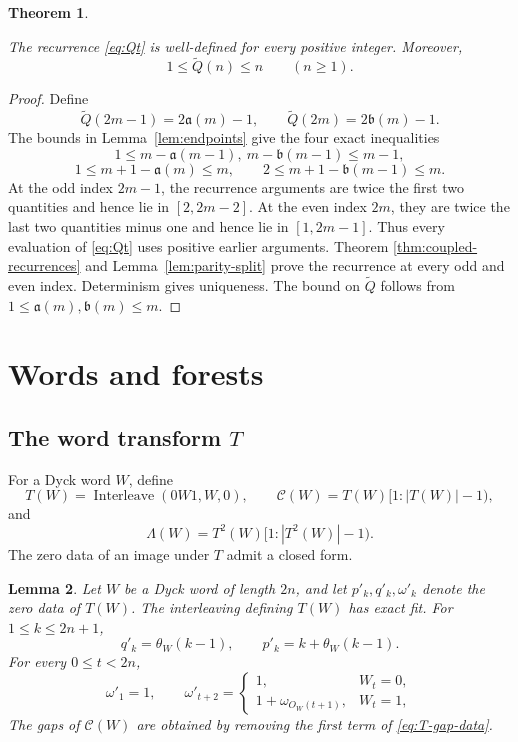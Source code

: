 \documentclass[11pt]{article}
\newtheorem{theorem}{Theorem}[section]
\newtheorem{lemma}[theorem]{Lemma}
\theoremstyle{definition}
\theoremstyle{remark}
\DeclareMathOperator{\Interleave}{Interleave}
\newcommand{\Qt}{\widetilde Q}
\newcommand{\Lam}{\Lambda}
\begin{document}
\begin{theorem}
\label{thm:well-definedness}

The recurrence \eqref{eq:Qt} is well-defined for every positive integer.
Moreover,
\[
 1\leq\Qt(n)\leq n\qquad(n\geq1).
\]
\end{theorem}

\begin{proof}
Define
\[
 \Qt(2m-1)=2\mathfrak a(m)-1,
 \qquad \Qt(2m)=2\mathfrak b(m)-1.
\]
The bounds in Lemma~\ref{lem:endpoints} give the four exact inequalities
\[
 1\leq m-\mathfrak a(m-1),\ m-\mathfrak b(m-1)\leq m-1,
\]
\[
 1\leq m+1-\mathfrak a(m)\leq m,
 \qquad
 2\leq m+1-\mathfrak b(m-1)\leq m.
\]
At the odd index \(2m-1\), the recurrence arguments are twice the first two
quantities and hence lie in \([2,2m-2]\).  At the even index \(2m\), they
are twice the last two quantities minus one and hence lie in
\([1,2m-1]\).  Thus every evaluation of \eqref{eq:Qt} uses positive earlier
arguments.  Theorem
\ref{thm:coupled-recurrences} and Lemma~\ref{lem:parity-split} prove the
recurrence at every odd and even index.  Determinism gives uniqueness.  The
bound on \(\Qt\) follows from \(1\leq \mathfrak a(m),\mathfrak b(m)\leq m\).
\end{proof}

\section{Words and forests}

\subsection{The word transform \texorpdfstring{\(T\)}{T}}
\label{sec:transform-T}

For a Dyck word \(W\), define
\[
 T(W)=\Interleave(0W1,W,0),
 \qquad
 \mathcal C(W)=T(W)[1:|T(W)|-1),
\]
and
\[
 \Lam(W)=T^2(W)[1:|T^2(W)|-1).
\]
The zero data of an image under $T$ admit a closed form.
\begin{lemma}
\label{lem:zero-data}
Let \(W\) be a Dyck word of length \(2n\), and let \(p'_k,q'_k,\omega'_k\)
denote the zero data of \(T(W)\).  The interleaving defining \(T(W)\) has
exact fit.  For \(1\leq k\leq2n+1\),
\begin{equation}
\label{eq:T-zero-data}
 q'_k=\theta_W(k-1),
 \qquad p'_k=k+\theta_W(k-1).
\end{equation}
For every \(0\leq t<2n\),
\begin{equation}
\label{eq:T-gap-data}
 \omega'_1=1,
 \qquad
 \omega'_{t+2}=
 \begin{cases}
 1,&W_t=0,\\
 1+\omega_{O_W(t+1)},&W_t=1,
 \end{cases}
\end{equation}
The gaps of \(\mathcal C(W)\) are obtained by removing
the first term of \eqref{eq:T-gap-data}.
\end{lemma}
\end{document}
